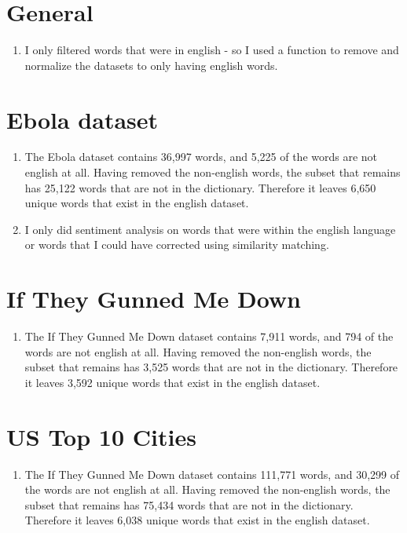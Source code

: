 \documentclass[11pt, oneside]{article}
\begin{document}
\section*{General}

\begin{enumerate}
\item I only filtered words that were in english - so I used a function to remove and normalize the datasets to only having english words.
\end{enumerate}

\section*{Ebola dataset}

\begin{enumerate}
\item The Ebola dataset contains 36,997 words, and 5,225 of the words are not english at all. Having removed the non-english words, the subset that remains has 25,122 words that are not in the dictionary. Therefore it leaves 6,650 unique words that exist in the english dataset. 
\item I only did sentiment analysis on words that were within the english language or words that I could have corrected using similarity matching. 
\end{enumerate}

\section*{If They Gunned Me Down}

\begin{enumerate}
\item The If They Gunned Me Down dataset contains 7,911 words, and 794 of the words are not english at all. Having removed the non-english words, the subset that remains has 3,525 words that are not in the dictionary. Therefore it leaves 3,592 unique words that exist in the english dataset. 
\end{enumerate}

\section*{US Top 10 Cities}

\begin{enumerate}
\item The If They Gunned Me Down dataset contains 111,771 words, and 30,299 of the words are not english at all. Having removed the non-english words, the subset that remains has 75,434 words that are not in the dictionary. Therefore it leaves 6,038 unique words that exist in the english dataset. 
\end{enumerate}
\end{document}
